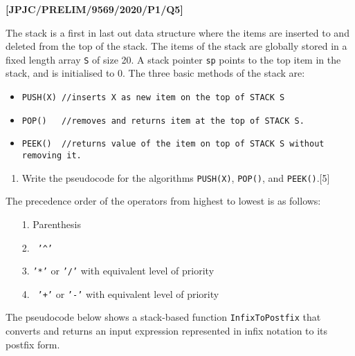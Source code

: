 \item \textbf{{[}JPJC/PRELIM/9569/2020/P1/Q5{]} }

The stack is a first in last out data structure where the items are
inserted to and deleted from the top of the stack. The items of the
stack are globally stored in a fixed length array \texttt{S} of size
20. A stack pointer \texttt{sp} points to the top item in the stack,
and is initialised to 0. The three basic methods of the stack are:
\begin{itemize}
\item \texttt{PUSH(X) //inserts X as new item on the top of STACK S }
\item \texttt{POP() ~~//removes and returns item at the top of STACK S. }
\item \texttt{PEEK() ~//returns value of the item on top of STACK S without
removing it. }
\end{itemize}
\begin{enumerate}
\item Write the pseudocode for the algorithms \texttt{PUSH(X)}, \texttt{POP()},
and \texttt{PEEK()}.\hfill{}{[}5{]}
\end{enumerate}
The precedence order of the operators from highest to lowest is as
follows: 
\begin{enumerate}
\item[1.]  Parenthesis 
\item[2.] \texttt{ '\textasciicircum ' }
\item[3.]  \texttt{'{*}'} or \texttt{'/'} with equivalent level of priority 
\item[4.] \texttt{ '+'} or \texttt{'-'} with equivalent level of priority
\end{enumerate}
The pseudocode below shows a stack-based function \texttt{InfixToPostfix}
that converts and returns an input expression represented in infix
notation to its postfix form.

